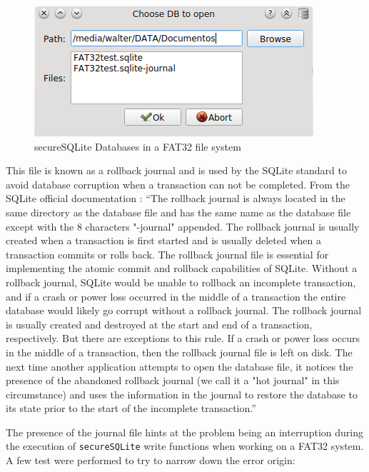 \begin{figure}[htb]
  \centering
  \captionsetup{justification=centering}
  \centerline{\includegraphics[width=0.55\columnwidth]{chapters/figures/development/fat32.png}}
  \caption{secureSQLite Databases in a FAT32 file system}
  \label{fig:fat32}
\end{figure}

This file is known as a rollback journal and is used by the SQLite standard to avoid database corruption when a transaction can not be completed. From the SQLite official documentation \cite{journal}:
``The rollback journal is always located in the same directory as the database file and has the same name as the database file except with the 8 characters "-journal" appended. The rollback journal is usually created when a transaction is first started and is usually deleted when a transaction commits or rolls back. The rollback journal file is essential for implementing the atomic commit and rollback capabilities of SQLite. Without a rollback journal, SQLite would be unable to rollback an incomplete transaction, and if a crash or power loss occurred in the middle of a transaction the entire database would likely go corrupt without a rollback journal.
The rollback journal is usually created and destroyed at the start and end of a transaction, respectively. But there are exceptions to this rule.
If a crash or power loss occurs in the middle of a transaction, then the rollback journal file is left on disk. The next time another application attempts to open the database file, it notices the presence of the abandoned rollback journal (we call it a "hot journal" in this circumstance) and uses the information in the journal to restore the database to its state prior to the start of the incomplete transaction.''

The presence of the journal file hints at the problem being an interruption during the execution of \texttt{secureSQLite} write functions when working on a FAT32 system. A few test were performed to try to narrow down the error origin:

